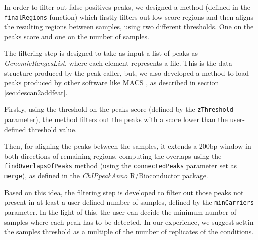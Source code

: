 
In order to filter out false positives peaks, we designed a method (defined in the \lstinline!finalRegions! function) which firstly filters out low score regions and then aligns the resulting regions between samples, using two different thresholds.
One on the peaks score and one on the number of samples.

The filtering step is designed to take as input a list of peaks as \textit{GenomicRangesList}, where each element represents a file.
This is the data structure produced by the peak caller, but, we also developed a method to load peaks produced by other software like MACS \cite{Zhang2008}, as described in section \ref{sec:descan2addfeat}.

Firstly, using the threshold on the peaks score (defined by the \lstinline!zThreshold! parameter), the method filters out the peaks with a score lower than the user-defined threshold value.

Then, for aligning the peaks between the samples, it extends a 200bp window in both directions of remaining regions, computing the overlaps using the \lstinline!findOverlapsOfPeaks! method (using the \lstinline!connectedPeaks! parameter set as \lstinline!merge!), as defined in the \textit{ChIPpeakAnno} \cite{Zhu2010} R/Bioconductor package.

Based on this idea, the filtering step is developed to filter out those peaks not present in at least a user-defined number of samples, defined by the \lstinline!minCarriers! parameter. In the light of this, the user can decide the minimum number of samples where each peak has to be detected.
In our experience, we suggest settin the samples threshold as a multiple of the number of replicates of the conditions.

